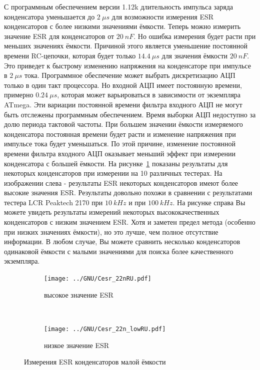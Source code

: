 С программным обеспечением версии 1.12k длительность импульса заряда конденсатора уменьшается до \(2~\mu s\) для
возможности измерения ESR конденсаторов с более низкими значениями ёмкости. Теперь можно измерить значение ESR
для конденсаторов от \(20~nF\).
Но ошибка измерения будет расти при меньших значениях ёмкости. Причиной этого является уменьшение постоянной времени
RC-цепочки, которая будет только \(14.4~\mu s\) для значения ёмкости \(20~nF\).
Это приведет к быстрому изменению напряжения на конденсаторе при импульсе в \(2~\mu s\) тока.
Программное обеспечение может выбрать дискретизацию АЦП только в один такт процессора.
Но входной АЦП имеет постоянную времени, примерно \(0.24~\mu s\), которая может варьироваться в зависимости
от экземпляра ATmega.
Эти вариации постоянной времени фильтра входного АЦП не могут быть отслежены программным обеспечением.
Время выборки АЦП недоступно за долю периода тактовой частоты.
При большем значении ёмкости измеряемого конденсатора постоянная времени будет расти и изменение напряжения 
при импульсе тока будет уменьшаться. По этой причине, изменение постоянной времени фильтра входного АЦП 
оказывает меньший эффект при измерении конденсатора с большей ёмкости.
На рисунке~\ref{pic:Cesr_22n} показаны результаты для некоторых конденсаторов при измерении на 10 различных тестерах.
На изображении слева - результаты ESR некоторых конденсаторов имеют более высокие значения ESR.
Результаты довольно похожи в сравнении с результатами тестера LCR Peaktech 2170 при \(10~kHz\) и при \(100~kHz\).
На рисунке справа Вы можете увидеть результаты измерений некоторых высококачественных конденсаторов с низким значением ESR.
Хотя и заметен предел метода (особенно при низких значениях ёмкости), но это лучше, чем полное отсутствие информации.
В любом случае, Вы можете сравнить несколько конденсаторов одинаковой ёмкости с малыми значениями для поиска 
более качественного экземпляра.

\begin{figure}[H]
  \begin{subfigure}[b]{.5\textwidth}
    \centering
    \texttt{[image: ../GNU/Cesr\_22nRU.pdf]}
    \caption{высокое значение ESR}
  \end{subfigure}
  ~
  \begin{subfigure}[b]{.5\textwidth}
    \centering
    \texttt{[image: ../GNU/Cesr\_22n\_lowRU.pdf]}
    \caption{низкое значение ESR}
  \end{subfigure}
  \caption{Измерения ESR конденсаторов малой ёмкости}
  \label{pic:Cesr_22n}
\end{figure}


